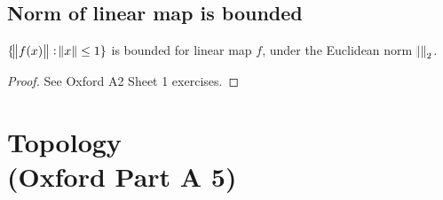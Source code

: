 \subsection{Norm of linear map is bounded}
\begin{theorem}
  $\{\norm{f(x)} : \norm{x} \leq 1\}$ is bounded for linear map $f$, under the Euclidean norm
  $\norm{}_2$.
\end{theorem}

\begin{proof}
  See Oxford A2 Sheet 1 exercises.
\end{proof}

\section{Topology\\(Oxford Part A 5)}